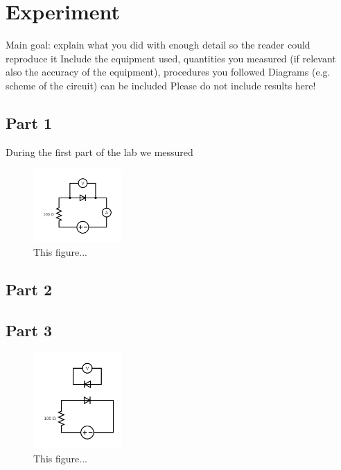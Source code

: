 \section{Experiment}

Main goal: explain what you did with enough detail so the reader could reproduce it
Include the equipment used, quantities you measured (if relevant also the accuracy of the
equipment), procedures you followed
Diagrams (e.g. scheme of the circuit) can be included
Please do not include results here!




\subsection{Part 1}
During the first part of the lab we messured 


\begin{figure}[H]
    \centering    \includegraphics[width=0.3\textwidth]{Figures/circuit_part1.png}
    \caption{This figure...}
    \label{fig:part1_circuit}
\end{figure}





    
\subsection{Part 2}




\subsection{Part 3}
\begin{figure}[H]
    \centering    \includegraphics[width=0.3\textwidth]{Figures/circuit_part3.png}
    \caption{This figure...}
    \label{fig:part3_circuit}
\end{figure}


